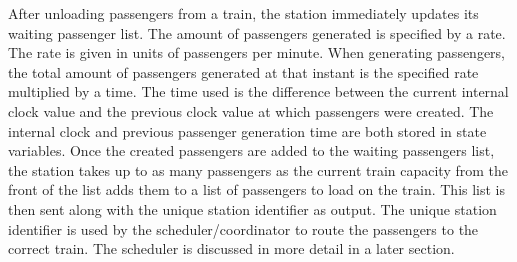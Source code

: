 After unloading passengers from a train, the station immediately updates its waiting passenger list.  The amount of passengers generated is specified by a rate.  The rate is given in units of passengers per minute.  When generating passengers, the total amount of passengers generated at that instant is the specified rate multiplied by a time.  The time used is the difference between the current internal clock value and the previous clock value at which passengers were created.  The internal clock and previous passenger generation time are both stored in state variables.  Once the created passengers are added to the waiting passengers list, the station takes up to as many passengers as the current train capacity from the front of the list adds them to a list of passengers to load on the train.  This list is then sent along with the unique station identifier as output.  The unique station identifier is used by the scheduler/coordinator to route the passengers to the correct train.  The scheduler is discussed in more detail in a later section. 
